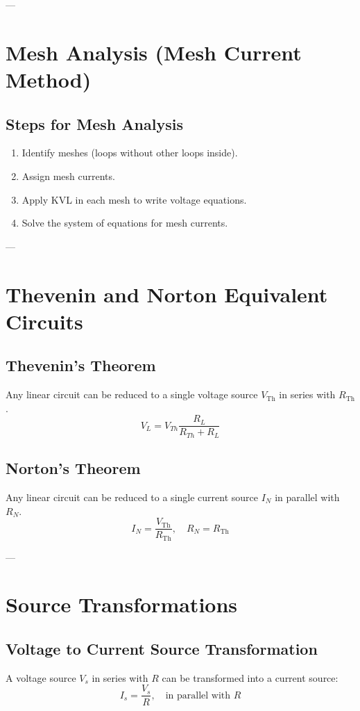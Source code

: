\documentclass[9pt]{article}
\begin{document}
\begin{multicols*}{2}
--- 

\section{Mesh Analysis (Mesh Current Method)}

\subsection{Steps for Mesh Analysis}
\begin{enumerate}\itemsep0pt
    \item Identify meshes (loops without other loops inside).
    \item Assign mesh currents.
    \item Apply KVL in each mesh to write voltage equations.
    \item Solve the system of equations for mesh currents.
\end{enumerate}

--- 

\section{Thevenin and Norton Equivalent Circuits}

\subsection{Thevenin's Theorem}
Any linear circuit can be reduced to a single voltage source \( V_{\text{Th}} \) in series with \( R_{\text{Th}} \).
\[ V_L=V_{Th}\frac{R_L}{R_{Th}+R_L} \]

\subsection{Norton's Theorem}
Any linear circuit can be reduced to a single current source \( I_N \) in parallel with \( R_N \).
\[ I_N = \frac{V_{\text{Th}}}{R_{\text{Th}}}, \quad R_N = R_{\text{Th}} \]

--- 

\section{Source Transformations}

\subsection{Voltage to Current Source Transformation}
A voltage source \( V_s \) in series with \( R \) can be transformed into a current source:
\[ I_s = \frac{V_s}{R}, \quad \text{in parallel with } R \]


\end{multicols*}
\end{document}
